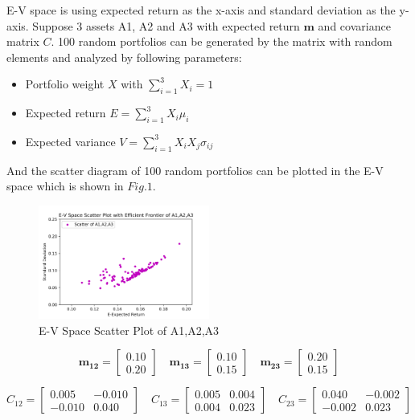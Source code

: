 \documentclass[sigconf]{acmart}
\begin{document}
  E-V space is using expected return as the x-axis and standard deviation as the y-axis. Suppose 3 assets A1, A2 and A3 with expected return $\bm{m}$ and covariance matrix $C$. 100 random portfolios can be generated by the matrix with random elements and analyzed by following parameters: 

\begin{itemize}
\item Portfolio weight $X$ with $ \sum_{i=1}^{3}X_{i}=1$
\item Expected return $E=\sum_{i=1}^{3}X_{i}\mu_{i}$
\item Expected variance $V=\sum_{i=1}^{3}X_{i}X_{j}\sigma_{ij}$
\end{itemize}

  And the scatter diagram of 100 random portfolios can be plotted in the E-V space which is shown in $Fig.1$.

\begin{figure}[htbp]
    \centering
    \includegraphics[width=0.5\textwidth]{1.png}
    \caption{\label{}E-V Space Scatter Plot of A1,A2,A3}
\end{figure}

\[
  \bm{m_{12}}=\begin{bmatrix}
0.10\\ 
0.20 
\end{bmatrix} \quad \bm{m_{13}}=\begin{bmatrix}
0.10\\ 
0.15 
\end{bmatrix} \quad   \bm{m_{23}}=\begin{bmatrix}
0.20\\ 
0.15 
\end{bmatrix}
\]

\[
C_{12}=\begin{bmatrix}
0.005 & -0.010\\ 
-0.010 & 0.040 
\end{bmatrix} \quad C_{13}=\begin{bmatrix}
0.005 & 0.004\\ 
0.004 & 0.023
\end{bmatrix} \quad   C_{23}=\begin{bmatrix}
0.040 & -0.002\\ 
-0.002 & 0.023 
\end{bmatrix}
\]
\end{document}
